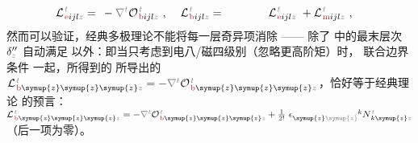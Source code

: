 \begin{subequations}
\begin{align}
	&{\mathcal{L}}^{\;\!\mathcolor{gray}{t}}_{\;\!\textcolor{Maroon}{\text{e}} ijl \mathcolor{gray}{z}} \hspace{-1em}&&=\hspace{0.2em} &&\hspace{-0.7em}- \mathcolor{gray}{\nabla^t} {\mathcal{O}}^{\;\!\mathcolor{gray}{t}}_{\;\!\textcolor{Maroon}{\text{b}} ijl \mathcolor{gray}{z}}~, &&\hspace{0.3em} {\mathcal{L}}^{\;\!\mathcolor{gray}{t}}_{\;\!\textcolor{Maroon}{\text{b}} ijl \mathcolor{gray}{z}} \hspace{-1em}&&=\hspace{0.2em} ~ \hphantom{-\frac{1}{2!} \epsilon^{\hphantom{ij}k}_{i\mathcolor{gray}{j}}} {\mathcal{L}}^{\;\!\mathcolor{gray}{t}}_{\;\!\textcolor{Maroon}{\text{e}} ijl \mathcolor{gray}{z}} &&\hspace{-0.7em}+ {\mathcal{L}}^{\;\!\mathcolor{gray}{t}}_{\;\!\textcolor{Maroon}{\text{m}} ijl \mathcolor{gray}{z}}~, \label{eq:Le-Lb}
\end{align}
\end{subequations}
然而可以验证，经典多极理论不能将每一层奇异项消除 —— 除了  中的最末层次 ${\delta}''_{\mathcolor{gray}{z}}$ 自动满足 以外：即当只考虑到电八/磁四级别（忽略更高阶矩）时， 联合边界条件  一起，所得到的  所导出的 ${\mathcal{L}}^{\;\!\mathcolor{gray}{t}}_{\;\!\textcolor{Maroon}{\text{b}} \symup{z} \symup{z} \symup{z} \mathcolor{gray}{z}} = - \mathcolor{gray}{\nabla^t} {\mathcal{O}}^{\;\!\mathcolor{gray}{t}}_{\;\!\textcolor{Maroon}{\text{b}} \symup{z} \symup{z} \symup{z} \mathcolor{gray}{z}}$，恰好等于经典理论  的预言：${\mathcal{L}}^{\;\!\mathcolor{gray}{t}}_{\;\!\textcolor{Maroon}{\text{b}} \symup{z} \symup{z} \symup{z} \mathcolor{gray}{z}} = - \mathcolor{gray}{\nabla^t} {\mathcal{O}}^{\;\!\mathcolor{gray}{t}}_{\;\!\textcolor{Maroon}{\text{b}} \symup{z} \symup{z} \symup{z} \mathcolor{gray}{z}} + \frac{1}{2!}~ \epsilon^{\hphantom{\symup{z} \symup{z}}k}_{\symup{z} \mathcolor{gray}{\symup{z}}} N^{\;\!\mathcolor{gray}{t}}_{\;\! k\symup{z}\mathcolor{gray}{z}}$（后一项为零）。


